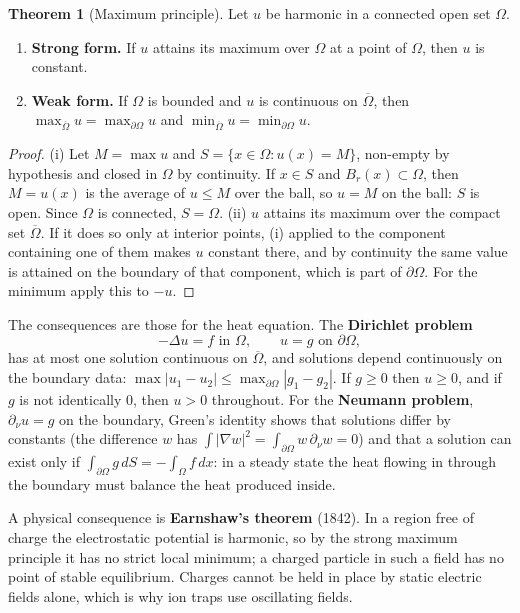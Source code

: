 \documentclass[11pt,a4paper]{article}
\numberwithin{equation}{section}
\theoremstyle{definition}
\newtheorem{thm}{Theorem}[subsection]
\begin{document}
\begin{thm}[Maximum principle]
\label{thm:maxlaplace}
Let $u$ be harmonic in a connected open set $\Omega$.
\begin{enumerate}[label=(\roman*)]
\item \textbf{Strong form.} If $u$ attains its maximum over $\Omega$ at a point of $\Omega$, then $u$ is constant.
\item \textbf{Weak form.} If $\Omega$ is bounded and $u$ is continuous on $\overline\Omega$, then $\max_{\overline\Omega}u = \max_{\partial\Omega}u$ and $\min_{\overline\Omega}u = \min_{\partial\Omega}u$.
\end{enumerate}
\end{thm}

\begin{proof}
(i) Let $M = \max u$ and $S = \{x \in \Omega : u(x) = M\}$, non-empty by hypothesis and closed in $\Omega$ by continuity. If $x \in S$ and $B_r(x) \subset \Omega$, then $M = u(x)$ is the average of $u \leq M$ over the ball, so $u = M$ on the ball: $S$ is open. Since $\Omega$ is connected, $S = \Omega$.
(ii) $u$ attains its maximum over the compact set $\overline\Omega$. If it does so only at interior points, (i) applied to the component containing one of them makes $u$ constant there, and by continuity the same value is attained on the boundary of that component, which is part of $\partial\Omega$. For the minimum apply this to $-u$.
\end{proof}

The consequences are those for the heat equation. The \textbf{Dirichlet problem}
\[
-\Delta u = f \text{ in } \Omega, \qquad u = g \text{ on } \partial\Omega ,
\]
has at most one solution continuous on $\overline\Omega$, and solutions depend continuously on the boundary data: $\max|u_1 - u_2| \leq \max_{\partial\Omega}|g_1 - g_2|$. If $g \geq 0$ then $u \geq 0$, and if $g$ is not identically $0$, then $u > 0$ throughout. For the \textbf{Neumann problem}, $\partial_\nu u = g$ on the boundary, Green's
identity shows that solutions differ by constants (the difference $w$ has $\int|\nabla w|^2 = \int_{\partial\Omega}w\,\partial_\nu w = 0$) and that a solution can exist only if $\int_{\partial\Omega}g\,dS = -\int_\Omega f\,dx$: in a steady state the heat flowing in through the boundary must balance the heat produced inside.

A physical consequence is \textbf{Earnshaw's theorem} (1842). In a region free of charge the electrostatic potential is harmonic, so by the strong maximum principle it has no strict local minimum; a charged particle in such a field has no point of stable equilibrium. Charges cannot be held in place by static
electric fields alone, which is why ion traps use oscillating fields.
\end{document}
